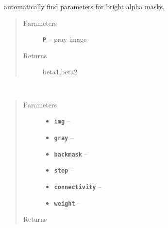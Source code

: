 \documentclass[letterpaper,10pt,english]{sphinxmanual}
\begin{document}

\begin{fulllineitems}
\label{RRtoolbox.tools:RRtoolbox.tools.segmentation.get_beta_params}
automatically find parameters for bright alpha masks.
\begin{quote}\begin{description}
\item[{Parameters}] \leavevmode
\textbf{\texttt{P}} -- gray image

\item[{Returns}] \leavevmode
beta1,beta2

\end{description}\end{quote}

\end{fulllineitems}


\begin{fulllineitems}
\label{RRtoolbox.tools:RRtoolbox.tools.segmentation.layeredfloods}~\begin{quote}\begin{description}
\item[{Parameters}] \leavevmode\begin{itemize}
\item {} 
\textbf{\texttt{img}} -- 

\item {} 
\textbf{\texttt{gray}} -- 

\item {} 
\textbf{\texttt{backmask}} -- 

\item {} 
\textbf{\texttt{step}} -- 

\item {} 
\textbf{\texttt{connectivity}} -- 

\item {} 
\textbf{\texttt{weight}} -- 

\end{itemize}

\item[{Returns}] \leavevmode


\end{description}\end{quote}

\end{fulllineitems}
\end{document}

